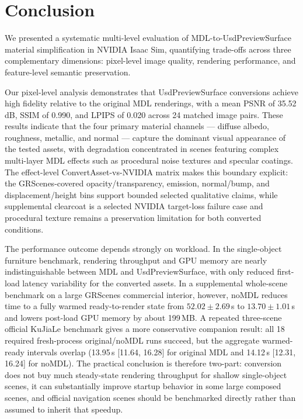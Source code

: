 \section{Conclusion}
\label{sec:conclusion}

We presented a systematic multi-level evaluation of MDL-to-UsdPreviewSurface
material simplification in NVIDIA Isaac Sim, quantifying trade-offs across
three complementary dimensions: pixel-level image quality, rendering performance,
and feature-level semantic preservation.

Our pixel-level analysis demonstrates that UsdPreviewSurface conversions
achieve high fidelity relative to the original MDL renderings, with a mean
PSNR of 35.52\,dB, SSIM of 0.990, and LPIPS of 0.020 across 24 matched image
pairs. These results indicate that the four primary material channels ---
diffuse albedo, roughness, metallic, and normal --- capture the dominant visual
appearance of the tested assets, with degradation concentrated in scenes
featuring complex multi-layer MDL effects such as procedural noise textures and
specular coatings. The effect-level ConvertAsset-vs-NVIDIA matrix makes this
boundary explicit: the GRScenes-covered opacity/transparency, emission,
normal/bump, and displacement/height bins support bounded selected qualitative
claims, while supplemental clearcoat is a selected NVIDIA target-loss failure
case and procedural texture remains a preservation limitation for both
converted conditions.

The performance outcome depends strongly on workload. In the single-object
furniture benchmark, rendering throughput and GPU memory are nearly
indistinguishable between MDL and UsdPreviewSurface, with only reduced
first-load latency variability for the converted assets. In a supplemental
whole-scene benchmark on a large GRScenes commercial interior, however, noMDL
reduces time to a fully warmed ready-to-render state from
$52.02 \pm 2.69$\,s to $13.70 \pm 1.01$\,s and lowers post-load GPU memory by
about 199\,MB. A repeated three-scene official KuJiaLe benchmark gives a more
conservative companion result: all 18 required fresh-process original/noMDL
runs succeed, but the aggregate warmed-ready intervals overlap
(13.95\,s [11.64, 16.28] for original MDL and 14.12\,s [12.31, 16.24] for
noMDL). The practical conclusion is therefore two-part: conversion does
not buy much steady-state rendering throughput for shallow single-object scenes,
it can substantially improve startup behavior in some large composed scenes,
and official navigation scenes should be benchmarked directly rather than
assumed to inherit that speedup.

